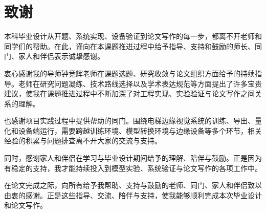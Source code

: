 
\chapter{致谢}

本科毕业设计从开题、系统实现、设备验证到论文写作的每一步，都离不开老师和同学们的帮助。在此，谨向在本课题推进过程中给予指导、支持和鼓励的师长、同门、家人和伴侣表示诚挚感谢。

衷心感谢我的导师钟竞辉老师在课题选题、研究收敛与论文组织方面给予的持续指导。老师在研究问题凝练、技术路线选择以及学术表达规范等方面提出了许多宝贵建议，使我在课题推进过程中不断加深了对工程实现、实验验证与论文写作之间关系的理解。

也感谢项目实践过程中提供帮助的同门。围绕电梯边缘视觉系统的训练、导出、量化和设备端运行，需要跨越训练环境、模型转换环境与边缘设备等多个环节，相关经验的积累与问题排查离不开大家的交流与支持。

同时，感谢家人和伴侣在学习与毕业设计期间给予的理解、陪伴与鼓励。正是因为有稳定的支持，我才能持续投入到模型实验、系统验证与论文写作的各项工作中。

在论文完成之际，向所有给予我帮助、支持与鼓励的老师、同门、家人和伴侣致以由衷的感谢。正是这些指导、交流、陪伴与支持，使我能够顺利完成本次毕业设计和论文写作。
